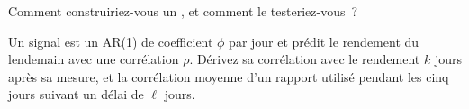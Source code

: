 \begin{interviewq}\label{iq:s1:positioning-and-sentiment:5}
Comment construiriez-vous un , et comment le testeriez-vous~?
\end{interviewq}

\begin{interviewq}\label{iq:s1:positioning-and-sentiment:6}
Un signal est un AR(1) de coefficient $\phi$ par jour et prédit le rendement du lendemain avec une corrélation $\rho$. Dérivez sa corrélation avec le rendement
$k$ jours après sa mesure, et la corrélation moyenne d'un rapport utilisé pendant les cinq jours suivant un délai de $\ell$ jours.
\end{interviewq}
